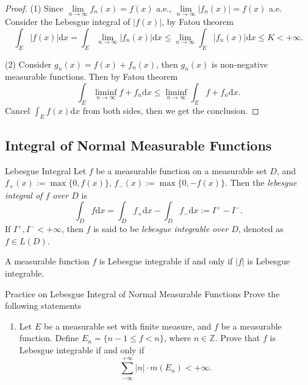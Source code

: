 \begin{proof}
  (1) Since $\lim \limits _{n \rightarrow \infty} f_n(x) = f(x)$ a.e.,
  $\lim \limits _{n \rightarrow \infty} |f_n(x)| = f(x)$ a.e.
  Consider the Lebesgue integral of $|f(x)|$, by Fatou theorem
  \begin{equation}
    \int_E |f(x)|\mathrm{d} x = \int_E \lim \limits _{n \rightarrow \infty} |f_n(x)| \mathrm{d} x
    \leq \lim \limits _{n \rightarrow \infty} \int_E |f_n(x)|\mathrm{d} x \leq K < +\infty.
  \end{equation}

  (2) Consider $g_n(x) = f(x) + f_n(x)$, then $g_n(x)$ is non-negative measurable functions.
  Then by Fatou theorem
  \begin{equation}
    \int_E \liminf_{n \rightarrow \infty} f + f_n \mathrm{d} x
    \leq \liminf_{n \rightarrow \infty} \int_E f + f_n \mathrm{d} x.
  \end{equation}
  Cancel $\int_E f(x)\mathrm{d} x$ from both sides, then we get the conclusion.
\end{proof}

\subsection{Integral of Normal Measurable Functions}

\begin{definition}{Lebesgue Integral}{}
  Let $f$ be a measurable function on a measurable set $D$,
  and $f_+(x) := \max\{0, f(x)\}$, $f_-(x) := \max\{0, -f(x)\}$.
  Then the \emph{lebesgue integral of $f$ over $D$} is
  \begin{equation}
    \int_D f \mathrm{d} x 
    = \int_D f_+ \mathrm{d} x - \int_D f_-\mathrm{d} x
    := I^+ - I^-.
  \end{equation}
  If $I^+, I^- < +\infty$, then $f$ is said to be \emph{lebesgue integrable over
    $D$}, denoted as $f \in L(D)$.
\end{definition}

\begin{note}
  A measurable function $f$ is Lebesgue integrable if and only if $|f|$
  is Lebesgue integrable.
\end{note}

\begin{example}{Practice on Lebesgue Integral of Normal Measurable Functions}{}
  Prove the following statements
  \begin{enumerate}
  \item Let $E$ be a measurable set with finite measure, and $f$ be a measurable function.
    Define $E_n = \{n - 1 \leq f < n\}$, where $n \in \mathbb{Z}$.
    Prove that $f$ is Lebesgue integrable if and only if
    \begin{equation}
      \sum\limits_{- \infty}^{+\infty} |n| \cdot m(E_n) < +\infty.
    \end{equation}
  \end{enumerate}
\end{example}

